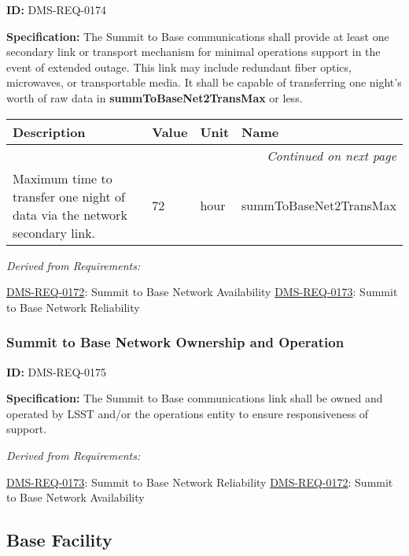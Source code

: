 \documentclass[SE,toc,lsstdraft]{lsstdoc}
\makeatletter
\newcommand{\paramname}[1]{\hspace{0pt}#1}
\newcommand{\unitname}[1]{\hspace{0pt}#1}
\newenvironment{parameters}[0]{%
\setlength\LTleft{0pt}
\setlength\LTright{\fill}
\begin{small}
\begin{longtable}[]{|p{0.5\textwidth}|l|p{0.6in}|p{1.74in}@{}|}

\hline \textbf{Description} & \textbf{Value} & \textbf{Unit} & \textbf{Name} \\ \hline
\endhead

\hline \multicolumn{4}{r}{\emph{Continued on next page}} \\
\endfoot

\hline\hline
\endlastfoot
}{%
\hline
\end{longtable}
\end{small}
}
\makeatother
\begin{document}
\label{DMS-REQ-0174}
\textbf{ID:} DMS-REQ-0174

\textbf{Specification:} The Summit to Base communications shall provide at least one secondary link or transport mechanism for minimal operations support in the event of extended outage.  This link may include redundant fiber optics, microwaves, or transportable media.  It shall be capable of transferring one night's worth of raw data in \textbf{summToBaseNet2TransMax }or less.





\begin{parameters}
Maximum time to transfer one night of data via the network secondary link.
&
72
&
\unitname{%
hour
}
&
\paramname{%
summToBaseNet2TransMax
} \\\hline
\end{parameters}




\emph{Derived from Requirements:}

\hyperref[DMS-REQ-0172]{DMS-REQ-0172}:
Summit to Base Network Availability \newline
\hyperref[DMS-REQ-0173]{DMS-REQ-0173}:
Summit to Base Network Reliability \newline


\subsubsection{Summit to Base Network Ownership and Operation}

\label{DMS-REQ-0175}
\textbf{ID:} DMS-REQ-0175

\textbf{Specification:} The Summit to Base communications link shall be owned and operated by LSST and/or the operations entity to ensure responsiveness of support.






\emph{Derived from Requirements:}

\hyperref[DMS-REQ-0173]{DMS-REQ-0173}:
Summit to Base Network Reliability \newline
\hyperref[DMS-REQ-0172]{DMS-REQ-0172}:
Summit to Base Network Availability \newline


\subsection{Base Facility}
\end{document}
